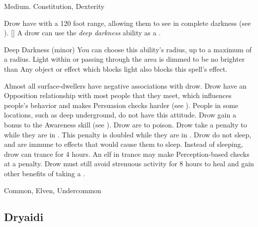          Medium.
          Constitution,  Dexterity
        \begin{itemize}
             Drow have  with a 120 foot range, allowing them to see in complete darkness (see ).
            [\sparkle] A drow can use the \textit{deep darkness} ability as a .
                \begin{magicalsustainability}{Deep Darkness}{ (minor)}
                    \rankline
                    You can choose this ability's radius, up to a maximum of a \areamed radius.
                    Light within or passing through the area is dimmed to be no brighter than 
                    Any object or effect which blocks light also blocks this spell's effect.
                \end{magicalsustainability}
             Almost all surface-dwellers have negative associations with drow.
                Drow have an Opposition relationship with most people that they meet, which influences people's behavior and makes Persuasion checks harder (see ).
                People in some locations, such as deep underground, do not have this attitude.
             Drow gain a  bonus to the Awareness skill (see ).
             Drow are  to poison.
             Drow take a  penalty to  while they are in .
                This penalty is doubled while they are in .
             Drow do not sleep, and are immune to \magical effects that would cause them to sleep.
                Instead of sleeping, drow can trance for 4 hours.
                An elf in trance may make Perception-based checks at a  penalty.
                Drow must still avoid strenuous activity for 8 hours to heal and gain other benefits of taking a .
        \end{itemize}
         Common, Elven, Undercommon

    \subsection{Dryaidi}

